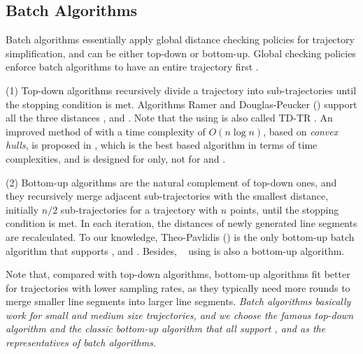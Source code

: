\subsection{Batch Algorithms}
Batch algorithms essentially apply global distance checking policies for trajectory simplification, and can be either top-down or bottom-up.
Global checking policies enforce batch algorithms to have an entire trajectory first \cite{Meratnia:Spatiotemporal}.

(1) Top-down algorithms recursively divide a trajectory into sub-trajectories until the stopping condition is met.
Algorithms Ramer \cite{Ramer:Split} and Douglas-Peucker (\dpa)  \cite{Douglas:Peucker}  support all the three distances \ped, \sed and \dad. {Note that  the \dpa using \sed is also called TD-TR \cite{Meratnia:Spatiotemporal}}.
An improved method of \dpa with a time complexity of $O(n\log n)$, based on \emph{convex hulls}, is proposed in \cite{Hershberger:Speeding}, which is the best \dpa based  algorithm in terms of time complexities, and is designed for \ped only, not for \sed and \dad.



(2) Bottom-up algorithms are the natural complement of top-down ones, and they recursively merge adjacent sub-trajectories with the smallest distance, initially $n/2$  sub-trajectories for a trajectory with $n$ points, until the stopping condition is met. In each iteration, the distances of newly generated line segments are recalculated.
To our knowledge, Theo-Pavlidis (\tpa) \cite{Pavlidis:Segment} is the only bottom-up batch \lsa algorithm that supports \ped, \sed and \dad. {Besides, \bumr~\cite{Chen:Fast} using \lissed is also a bottom-up algorithm.}

Note that, compared with top-down algorithms, bottom-up algorithms fit better for trajectories with lower sampling rates, as they typically need more rounds to merge smaller line segments into larger line segments. {\em Batch algorithms basically work for small and medium size trajectories, and we choose {the famous top-down algorithm} \dpa and {the classic bottom-up algorithm} \tpa that all support \ped, \sed and \dad  as the representatives of batch \lsa algorithms}.


